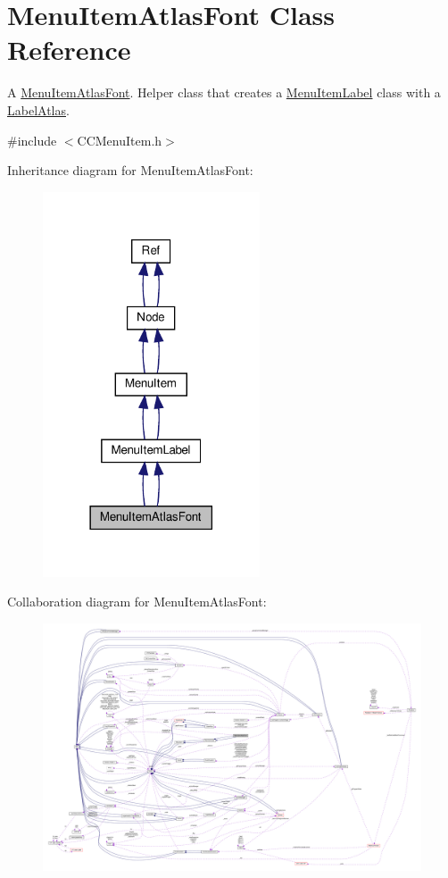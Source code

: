 \hypertarget{classMenuItemAtlasFont}{}\section{Menu\+Item\+Atlas\+Font Class Reference}
\label{classMenuItemAtlasFont}


A \hyperlink{classMenuItemAtlasFont}{Menu\+Item\+Atlas\+Font}. Helper class that creates a \hyperlink{classMenuItemLabel}{Menu\+Item\+Label} class with a \hyperlink{classLabelAtlas}{Label\+Atlas}.  




{\ttfamily \#include $<$C\+C\+Menu\+Item.\+h$>$}



Inheritance diagram for Menu\+Item\+Atlas\+Font\+:
\nopagebreak
\begin{figure}[H]
\begin{center}
\leavevmode
\includegraphics[width=182pt]{classMenuItemAtlasFont__inherit__graph}
\end{center}
\end{figure}


Collaboration diagram for Menu\+Item\+Atlas\+Font\+:
\nopagebreak
\begin{figure}[H]
\begin{center}
\leavevmode
\includegraphics[width=350pt]{classMenuItemAtlasFont__coll__graph}
\end{center}
\end{figure}
